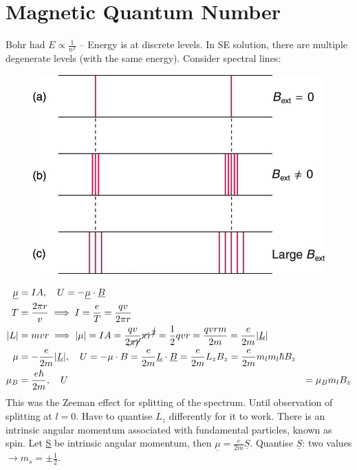 \documentclass[a4paper, 11pt, normalem]{report}
\begin{document}
\section{Magnetic Quantum Number}
Bohr had $E \propto \frac{1}{n^{2}}$ -- Energy is at discrete levels.
In SE solution, there are multiple degenerate levels (with the same energy).
Consider spectral lines:
\begin{figure}[H]
    \centering
    \includegraphics{MLS.jpg}
\end{figure}
\begin{align}
    \underline{\mu} &= IA,\quad U = -\underline{\mu}\cdot\underline{B} \\
    T &= \frac{2\pi r}{v} \implies I = \frac{e}{T} = \frac{qv}{2\pi r} \\
    |L| &= mvr \implies |\mu| = IA = \frac{qv}{2\cancel{\pi}\cancel{r}}\cancel{\pi}r^{\cancel{2}} = \frac{1}{2}qvr = \frac{qvrm}{2m} = \frac{e}{2m}|\underline{L}| \\
    \mu &= -\frac{e}{2m}|\underline{L}|,\quad U = -\mu \cdot B = \frac{e}{2m}\underline{L} \cdot \underline{B} = \frac{e}{2m}L_{z}B_{z} = \frac{e}{2m}m_{l}m_{l}\hbar B_{z} \\
    \mu_{B} &= \frac{e\hbar}{2m},\quad U &= \mu_{B}m_{l}B_{z}
\end{align}
This was the Zeeman effect for splitting of the spectrum.
Until observation of splitting at $l = 0$.
Have to quantise $L_{z}$ differently for it to work.
There is an intrinsic angular momentum associated with fundamental particles, known as spin.
Let \underline{S} be intrinsic angular momentum, then $\underline{\mu} = \frac{e}{2m}\underline{S}$.
Quantise $\underline{S}$: two values $\rightarrow m_{s} = \pm \frac{1}{2}$.
\end{document}
